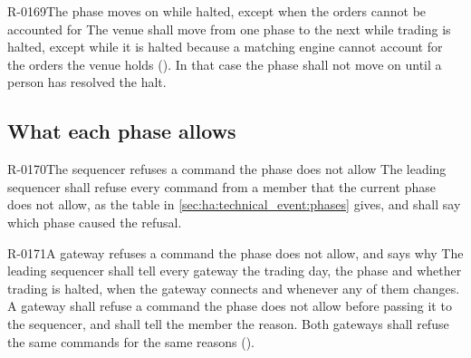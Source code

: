 \begin{requirement}{R-0169}{The phase moves on while halted, except when the orders cannot be accounted for}
  The venue shall move from one phase to the next while trading is halted, except while it is
  halted because a matching engine cannot account for the orders the venue holds
  (). In that case the phase shall not move on until a person has resolved the
  halt.
\end{requirement}

\subsection{What each phase allows}
\label{sec:ha:technical_event:allows}

\begin{requirement}{R-0170}{The sequencer refuses a command the phase does not allow}
  The leading sequencer shall refuse every command from a member that the current phase does not
  allow, as the table in \cref{sec:ha:technical_event:phases} gives, and shall say which phase
  caused the refusal.
\end{requirement}

\begin{requirement}{R-0171}{A gateway refuses a command the phase does not allow, and says why}
  The leading sequencer shall tell every gateway the trading day, the phase and whether trading is
  halted, when the gateway connects and whenever any of them changes. A gateway shall refuse a
  command the phase does not allow before passing it to the sequencer, and shall tell the member
  the reason. Both gateways shall refuse the same commands for the same reasons
  ().
\end{requirement}

